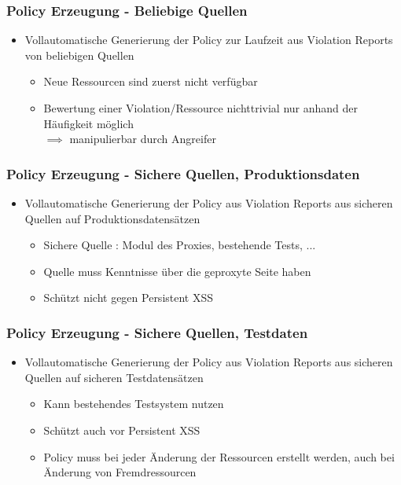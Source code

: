 \documentclass[handout]{beamer}
\begin{document}
\begin{frame}[c]
\frametitle{Policy Erzeugung - Beliebige Quellen}
\begin{itemize}
\item Vollautomatische Generierung der Policy zur Laufzeit aus Violation Reports von beliebigen Quellen
\begin{itemize}
\item Neue Ressourcen sind zuerst nicht verfügbar
\item Bewertung einer Violation/Ressource nichttrivial nur anhand der Häufigkeit möglich \\$\implies$ manipulierbar durch Angreifer
\end{itemize}
\end{itemize}
\end{frame}

\begin{frame}[c]
\frametitle{Policy Erzeugung - Sichere Quellen, Produktionsdaten}
\begin{itemize}
\item Vollautomatische Generierung der Policy aus Violation Reports aus sicheren Quellen auf Produktionsdatensätzen
\begin{itemize}
\item Sichere Quelle : Modul des Proxies, bestehende Tests, ...
\item Quelle muss Kenntnisse über die geproxyte Seite haben
\item Schützt nicht gegen Persistent XSS 
\end{itemize}
\end{itemize}
\end{frame}

\begin{frame}[c]
\frametitle{Policy Erzeugung - Sichere Quellen, Testdaten}
\begin{itemize}
\item Vollautomatische Generierung der Policy aus Violation Reports aus sicheren Quellen auf sicheren Testdatensätzen
\begin{itemize}
\item Kann bestehendes Testsystem nutzen
\item Schützt auch vor Persistent XSS
\item Policy muss bei jeder Änderung der Ressourcen erstellt werden, auch bei Änderung von Fremdressourcen
\end{itemize}
\end{itemize}
\end{frame}
\end{document}
